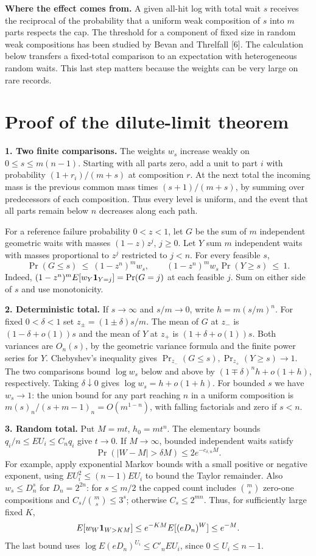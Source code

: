 \documentclass[11pt]{article}
\begin{document}
\textbf{Where the effect comes from.} A given all-hit log with total wait $s$ receives the reciprocal of the probability that a uniform weak composition of $s$ into $m$ parts respects the cap. The threshold for a component of fixed size in random weak compositions has been studied by Bevan and Threlfall [6]. The calculation below transfers a fixed-total comparison to an expectation with heterogeneous random waits. This last step matters because the weights can be very large on rare records.

\newpage
\section*{Proof of the dilute-limit theorem}
\textbf{1. Two finite comparisons.} The weights $w_s$ increase weakly on $0\le s\le m(n-1)$. Starting with all parts zero, add a unit to part $i$ with probability $(1+r_i)/(m+s)$ at composition $r$. At the next total the incoming mass is the previous common mass times $(s+1)/(m+s)$, by summing over predecessors of each composition. Thus every level is uniform, and the event that all parts remain below $n$ decreases along each path.

For a reference failure probability $0<z<1$, let $G$ be the sum of $m$ independent geometric waits with masses $(1-z)z^j$, $j\ge0$. Let $Y$ sum $m$ independent waits with masses proportional to $z^j$ restricted to $j<n$. For every feasible $s$,
\[
 \Pr(G\le s)\ \le\ (1-z^n)^m w_s,\qquad
 (1-z^n)^m w_s\Pr(Y\ge s)\ \le\ 1 .
\]
Indeed, $(1-z^n)^m E[w_Y{\bf1}_{Y=j}]=\Pr(G=j)$ at each feasible $j$. Sum on either side of $s$ and use monotonicity.

\textbf{2. Deterministic total.} If $s\to\infty$ and $s/m\to0$, write $h=m(s/m)^n$. For fixed $0<\delta<1$ set $z_\pm=(1\pm\delta)s/m$. The mean of $G$ at $z_-$ is $(1-\delta+o(1))s$ and the mean of $Y$ at $z_+$ is $(1+\delta+o(1))s$. Both variances are $O_n(s)$, by the geometric variance formula and the finite power series for $Y$. Chebyshev's inequality gives $\Pr_{z_-}(G\le s),\Pr_{z_+}(Y\ge s)\to1$. The two comparisons bound $\log w_s$ below and above by $(1\mp\delta)^n h+o(1+h)$, respectively. Taking $\delta\downarrow0$ gives $\log w_s=h+o(1+h)$. For bounded $s$ we have $w_s\to1$: the union bound for any part reaching $n$ in a uniform composition is $m(s)_n/(s+m-1)_n=O(m^{1-n})$, with falling factorials and zero if $s<n$.

\textbf{3. Random total.} Put $M=mt$, $h_0=mt^n$. The elementary bounds $q_i/n\le EU_i\le C_nq_i$ give $t\to0$. If $M\to\infty$, bounded independent waits satisfy
\[
 \Pr(|W-M|>\delta M)\le 2e^{-c_{\delta,n}M}.
\]
For example, apply exponential Markov bounds with a small positive or negative exponent, using $EU_i^2\le(n-1)EU_i$ to bound the Taylor remainder. Also $w_s\le D_n^s$ for $D_n=2^{2n}$: for $s\le m/2$ the capped count includes $\binom ms$ zero-one compositions and $C_s/\binom ms\le3^s$; otherwise $C_s\le2^{mn}$. Thus, for sufficiently large fixed $K$,
\[
 E[w_W{\bf1}_{W>KM}]\le e^{-KM} E[(eD_n)^W]\le e^{-M}.
\]
The last bound uses $\log E(eD_n)^{U_i}\le C'_n EU_i$, since $0\le U_i\le n-1$.
\end{document}
